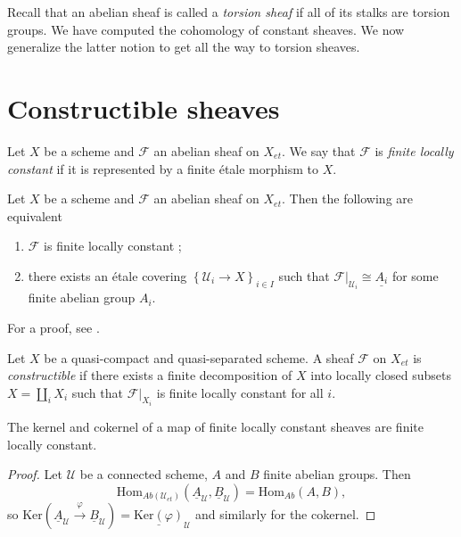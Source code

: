 \noindent
Recall that an abelian sheaf is called a {\it torsion sheaf} if all of its
stalks are torsion groups. We have computed the cohomology of constant sheaves.
We now generalize the latter notion to get all the way to torsion sheaves.




\section{Constructible sheaves}

\begin{definition}
\label{definition-finite-locally-constant}
Let $X$ be a scheme and $\mathcal{F}$ an abelian sheaf on $X_{et}$. We say that
$\mathcal{F}$ is {\it finite locally constant} if it is represented by a
finite \'etale morphism to $X$.
\end{definition}

\begin{lemma}
\label{lemma-characterize-finite-locally-constant}
Let $X$ be a scheme and $\mathcal{F}$ an abelian sheaf on $X_{et}$. Then the
following are equivalent
\begin{enumerate}
\item
$\mathcal{F}$ is finite locally constant ;
\item
there exists an \'etale covering $\left\{ \mathcal{U}_i \to X\right\}_{i\in I}$
such that $\mathcal{F}|_{\mathcal{U}_i} \cong \underline{A_i}$ for some finite
abelian group $A_i$.
\end{enumerate}
\end{lemma}

\noindent
For a proof, see \cite{SGA4.5}.

\begin{definition}
\label{definition-constructible}
Let $X$ be a quasi-compact and quasi-separated scheme. A sheaf $\mathcal{F}$ on
$X_{et}$ is {\it constructible} if there exists a finite decomposition of $X$
into locally closed subsets $X=\coprod_i X_i$ such that $\mathcal{F}|_{X_i}$ is
finite locally constant for all $i$.
\end{definition}

\begin{lemma}
\label{lemma-kernel-finite-locally-constant}
The kernel and cokernel of a map of finite locally constant sheaves are finite
locally constant.
\end{lemma}

\begin{proof}
Let $\mathcal{U}$ be a connected scheme, $A$ and $B$ finite abelian groups.
Then
$$
\text{Hom}_{\textit{Ab}(\mathcal{U}_{et})} \left(\underline A_\mathcal{U},
\underline B_\mathcal{U}\right) = \text{Hom}_{\textit{Ab}}(A, B),
$$
so $\text{Ker}\left(\underline A_\mathcal{U} \xrightarrow{\varphi} \underline
B_\mathcal{U}\right) = \underline{\text{Ker}(\varphi)}_\mathcal{U}$ and
similarly for the cokernel.
\end{proof}

